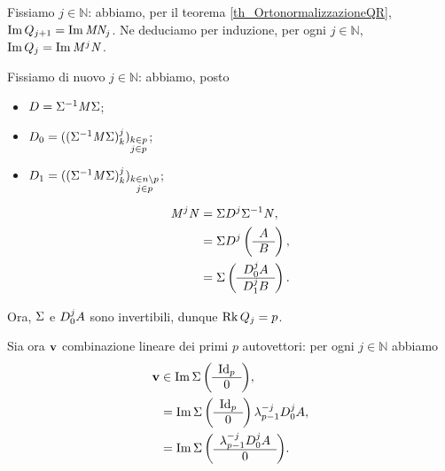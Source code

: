 \Proof Fissiamo $j \in \mathbb{N}$:
abbiamo, per il teorema \ref{th_OrtonormalizzazioneQR},
$\operatorname{Im}{Q_{j + 1}} = \operatorname{Im}{\mathit{M} \mathit{N}_j}$.
Ne deduciamo per induzione, per ogni $j \in \mathbb{N}$,
$\operatorname{Im}{Q_j} = \operatorname{Im}{\mathit{M}^j \mathit{N}}$.
\par Fissiamo di nuovo $j \in \mathbb{N}$: abbiamo, posto
\begin{itemize}
  \item $D = \Sigma^{-1} \mathit{M} \Sigma$;
  \item $D_0 =
    ((\Sigma^{-1} \mathit{M} \Sigma)_k^j)_{
    \substack{k \in p\\j \in p}}$;
  \item $D_1 =
    ((\Sigma^{-1} \mathit{M} \Sigma)_k^j)_{
    \substack{k \in n \setminus p\\j \in p}}$;
\end{itemize}
\begin{align*}
  \mathit{M}^j \mathit{N}
  &= \Sigma D^j \Sigma^{-1} \mathit{N},\\
  &= \Sigma D^j
    \left (
    \begin{array}{c}
      A\\
      \hline
      B
    \end{array}
    \right ),\\
  &= \Sigma
    \left (
    \begin{array}{c}
      D_0^j A\\
      \hline
      D_1^j B
    \end{array}
    \right ).
\end{align*}
\par Ora, $\Sigma$ e $D_0^j A$ sono invertibili,
dunque $\operatorname{Rk}{Q_j} = p$.
\par Sia ora $\mathbf{v}$ combinazione lineare dei primi $p$ autovettori:
per ogni $j \in \mathbb{N}$ abbiamo
\begin{align*}
  \Vector
  &\in \Image{
  \SpectralBaseChange
  \lmatrix
  \begin{array}{c}
    \Identity[p]\\
    \hline
    0
  \end{array}
  \rmatrix},\\
  &= \Image{
  \SpectralBaseChange
  \lmatrix
  \begin{array}{c}
    \Identity[p]\\
    \hline
    0
  \end{array}
  \rmatrix
  \Eigenvalue_{p - 1}^{-j} \DiagonalMatrix_0^j A},\\
  &= \Image{
  \SpectralBaseChange
  \lmatrix
  \begin{array}{c}
    \Eigenvalue_{p - 1}^{-j} \DiagonalMatrix_0^j A\\
    \hline
    0
  \end{array}
  \rmatrix}.
\end{align*}
